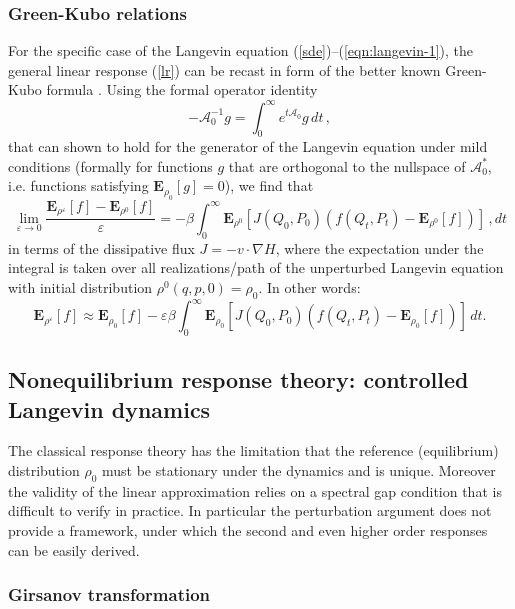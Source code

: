 \documentclass[]{tMPH2e}
\newcommand{\eps}{\varepsilon}
\newcommand{\cA}{\mathcal A}
\newcommand{\bE}{{\mathbf E}}
\begin{document}
\subsubsection*{Green-Kubo relations} 
For the specific case of the Langevin equation (\ref{sde})--(\ref{eqn:langevin-1}), the general linear response (\ref{lr}) can be recast in form of the better known Green-Kubo formula \cite{MarconiPhysRep,Risken}. Using the formal operator identity 
\[
-\cA_{0}^{-1} g = \int_{0}^{\infty}e^{t\cA_{0}}g \,dt\,,
\]
that can shown to hold for the generator of the Langevin equation under mild conditions (formally for functions $g$ that are orthogonal to the nullspace of $\cA_{0}^{*}$, i.e. functions satisfying $\bE_{\rho_{0}}[g]=0$), we find that 
\begin{equation}\label{GreenKubo}
\lim_{\eps\to 0}\frac{\bE_{\rho^{\eps}}[f] - \bE_{\rho^{0}}[f]}{\eps} = -\beta\int_{0}^{\infty}\bE_{\rho^{0}}[J(Q_{0},P_{0}) (f(Q_{t},P_{t})-\bE_{\rho^{0}}[f])]\,,dt
\end{equation}
in terms of the dissipative flux $J=-v\cdot\nabla H$, where the expectation under the integral is taken over all realizations/path of the unperturbed Langevin equation with initial distribution $\rho^{0}(q,p,0)=\rho_{0}$. In other words: 
\[
\bE_{\rho^{\eps}}[f] \approx \bE_{\rho_{0}}[f] - \eps\beta\int_{0}^{\infty}\bE_{\rho_{0}}[J(Q_{0},P_{0}) (f(Q_{t},P_{t})-\bE_{\rho_{0}}[f])]\,dt.
\]





\subsection{Nonequilibrium response theory: controlled Langevin dynamics}

The classical response theory has the limitation that the reference (equilibrium) distribution $\rho_{0}$ must be stationary under the dynamics and is unique. Moreover the validity of the linear approximation relies on a spectral gap condition that is difficult to verify in practice. In particular the perturbation argument does not provide a framework, under which the second and even higher order responses can be easily derived. 

\subsubsection*{Girsanov transformation}
\end{document}
